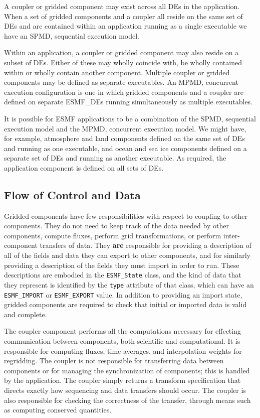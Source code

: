 A coupler or gridded component may exist across all DEs in 
the application.  When 
a set of gridded  components and a coupler all reside on the same set of 
DEs and are contained within an application running as a single 
executable we have an SPMD, sequential execution model.

Within an application, a coupler or gridded component may also reside on 
a subset of DEs.  Either of these may wholly coincide with, be
wholly 
contained within or wholly contain another component.  Multiple coupler 
or gridded components may be defined as separate executables.  An MPMD, 
concurrent execution configuration is one in which gridded components and 
a coupler are defined on separate ESMF\_DEs running simultaneously as multiple 
executables.

It is possible for ESMF applications to be a combination of the SPMD, 
sequential 
execution model and the MPMD, concurrent execution model.  We might have,
for example, atmosphere and land components defined on the same set of 
DEs and running as one executable, and ocean and sea ice 
components defined on a separate set of DEs and running as 
another executable.  As required, the application component is defined
on all sets of DEs.

\subsection{Flow of Control and Data}

Gridded components have few responsibilities with respect to coupling
to other components.  They do not need to keep track of the data needed
by other components, compute fluxes, perform grid transformations, or 
perform inter-component transfers of data.  They {\bf are} responsible for 
providing a description of all of the fields and data they
can export to other components, and for similarly providing a description 
of the fields they must import in order to run.  These descriptions are
embodied in the {\tt ESMF\_State} class, and the kind of data that they 
represent is identified by the {\tt type} attribute of that class, which can
have an {\tt ESMF\_IMPORT} or {\tt ESMF\_EXPORT} value.  In addition to 
providing an import state, gridded components are required to check that 
initial or imported data is valid and complete.

The coupler component performs all the computations necessary for effecting
communication between components, both scientific and computational.  
It is responsible for computing fluxes, time averages, and interpolation 
weights for regridding.  The coupler is not responsible for transferring
data between components or for managing the synchronization of components;
this is handled by the application.  The coupler simply returns a transform 
specification that directs exactly how sequencing and data transfers should 
occur.  The coupler is also responsible for checking the correctness of 
the transfer, through means such as computing conserved quantities.

